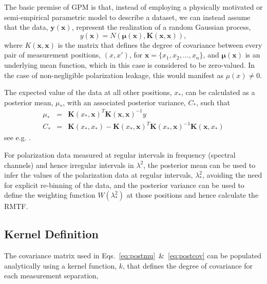 \documentclass[fleqn,usenatbib]{mnras}
\begin{document}
The basic premise of GPM is that, instead of employing a physically motivated or semi-empirical parametric model to describe a dataset, we can instead assume that the data, $\mathbf{y}(\mathbf{x})$, represent the realization of a random Gaussian process,
%
\begin{equation}
y(\mathbf{x}) = N(\mathbf{\mu}(\mathbf{x}), \mathbf{K}(\mathbf{x},\mathbf{x})),
\end{equation}
%
where $ K(\mathbf{x},\mathbf{x})$ is the matrix that defines the degree of covariance between every pair of measurement positions, $(x,x')$, for $\mathbf{x} = \{x_1, x_2, \dots, x_n\}$, and $\mathbf{\mu}(\mathbf{x})$ is an underlying mean function, which in this case is considered to be zero-valued. In the case of non-negligible polarization leakage, this would manifest as $\mu(x)\neq 0$.

The expected value of the data at all other positions, $x_{\ast}$, can be calculated as a posterior mean, $\mu_{\ast}$, with an associated posterior variance, $C_{\ast}$, such that
%
\begin{eqnarray}
\label{eq:postmu} \mu_{\ast} &=&  \mathbf{K}(x_{\ast},\mathbf{x})^T \mathbf{K}(\mathbf{x},\mathbf{x})^{-1} y  \\
\label{eq:postcov} C_{\ast} &=&  \mathbf{K}(x_{\ast},x_{\ast}) - \mathbf{K}(x_{\ast},\mathbf{x})^T \mathbf{K}(x_{\ast},\mathbf{x})^{-1} \mathbf{K}(\mathbf{x},x_{\ast})
\end{eqnarray}
%
see e.g. \cite{3569, article}.

For polarization data measured at regular intervals in frequency (spectral channels) and hence irregular intervals in $\lambda^2$, the posterior mean can be used to infer the values of the polarization data at regular intervals, $\lambda_{\ast}^2$, avoiding the need for explicit re-binning of the data, and the posterior variance can be used to define the weighting function $W(\lambda_{\ast}^2)$ at those positions and hence calculate the RMTF.

\subsection{Kernel Definition}

The covariance matrix used in Eqs.~\ref{eq:postmu}~\&~\ref{eq:postcov} can be populated analytically using a kernel function, $k$, that defines the degree of covariance for each measurement separation,
\end{document}
